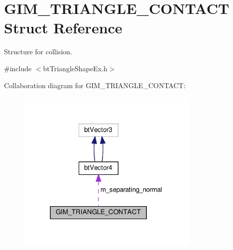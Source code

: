 \hypertarget{structGIM__TRIANGLE__CONTACT}{}\section{G\+I\+M\+\_\+\+T\+R\+I\+A\+N\+G\+L\+E\+\_\+\+C\+O\+N\+T\+A\+CT Struct Reference}
\label{structGIM__TRIANGLE__CONTACT}


Structure for collision.  




{\ttfamily \#include $<$bt\+Triangle\+Shape\+Ex.\+h$>$}



Collaboration diagram for G\+I\+M\+\_\+\+T\+R\+I\+A\+N\+G\+L\+E\+\_\+\+C\+O\+N\+T\+A\+CT\+:
\nopagebreak
\begin{figure}[H]
\begin{center}
\leavevmode
\includegraphics[width=250pt]{structGIM__TRIANGLE__CONTACT__coll__graph}
\end{center}
\end{figure}
